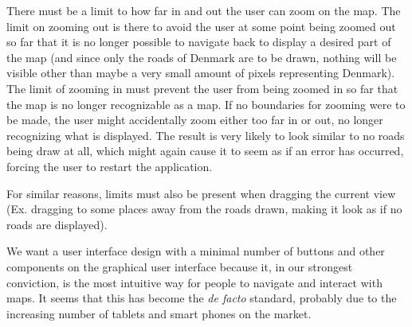 There must be a limit to how far in and out the user can zoom on the map. The limit on zooming out is there to avoid the user at some point being zoomed out so far that it is no longer possible to navigate back to display a desired part of the map (and since only the roads of Denmark are to be drawn, nothing will be visible other than maybe a very small amount of pixels representing Denmark). The limit of zooming in must prevent the user from being zoomed in so far that the map is no longer recognizable as a map. If no boundaries for zooming were to be made, the user might accidentally zoom either too far in or out, no longer recognizing what is displayed. The result is very likely to look similar to no roads being draw at all, which might again cause it to seem as if an error has occurred, forcing the user to restart the application.

For similar reasons, limits must also be present when dragging the current view (Ex. dragging to some places away from the roads drawn, making it look as if no roads are displayed).

We want a user interface design with a minimal number of buttons and other components on the graphical user interface because it, in our strongest conviction, is the most intuitive way for people to navigate and interact with maps. It seems that this has become the \textit{de facto} standard, probably due to the increasing number of tablets and smart phones on the market.

